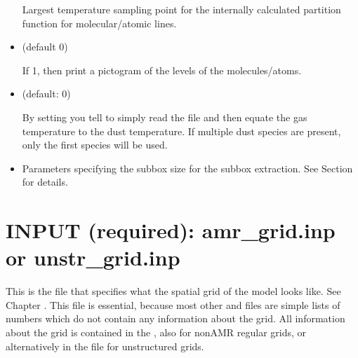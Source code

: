 \documentclass[letterpaper,10pt,english]{sphinxmanual}
\begin{document}
\begin{itemize}
Largest temperature sampling point for the internally calculated
partition function for molecular/atomic lines.

\item {} 
 (default 0)

If 1, then print a pictogram of the levels of the molecules/atoms.

\item {} 
 (default: 0)

By setting  you tell  to
simply read the  file and then equate
the gas temperature to the dust temperature. If multiple dust species
are present, only the first species will be used.

\item {} 

Parameters specifying the subbox size for the subbox extraction.
See Section {\hyperref[\detokenize{toolsinside:sec-subbox}]{}} for details.

\end{itemize}


\section{INPUT (required): amr\_grid.inp or unstr\_grid.inp}
\label{\detokenize{inputoutputfiles:input-required-amr-grid-inp-or-unstr-grid-inp}}\label{\detokenize{inputoutputfiles:sec-grid-input}}
This is the file that specifies what the spatial grid of the model looks
like. See Chapter {\hyperref[\detokenize{gridding:chap-gridding}]{}}. This file is essential, because most
other  and  files are simple lists of numbers which do not
contain any information about the grid. All information about the grid is
contained in the , also for non\sphinxhyphen{}AMR regular grids, or alternatively
in the  file for unstructured grids.
\end{document}
